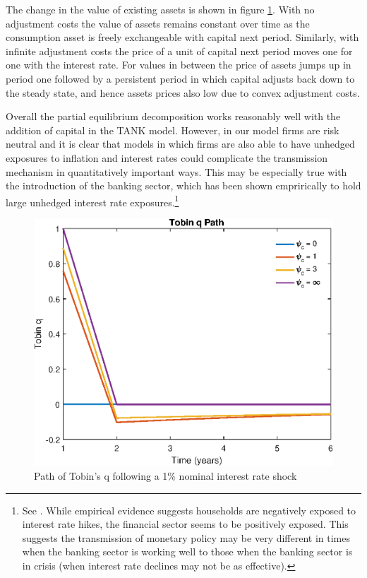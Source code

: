 \documentclass[titlepage]{\econtex}\newcommand{\texname}{ConsumptionHeterogeneity}
\begin{document}


The change in the value of existing assets is shown in figure \ref{fig:PathTobinq}. With no adjustment costs the value of assets remains constant over time as the consumption asset is freely exchangeable with capital next period. Similarly, with infinite adjustment costs the price of a unit of capital next period moves one for one with the interest rate. For values in between the price of assets jumps up in period one followed by a persistent period in which capital adjusts back down to the steady state, and hence assets prices also low due to convex adjustment costs.

Overall the partial equilibrium decomposition works reasonably well with the addition of capital in the TANK model. However, in our model firms are risk neutral and it is clear that models in which firms are also able to have unhedged exposures to inflation and interest rates could complicate the transmission mechanism in quantitatively important ways. This may be especially true with the introduction of the banking sector, which has been shown emprirically to hold large unhedged interest rate exposures.\footnote{See \cite{landier_banks_2013}. While empirical evidence suggests households are negatively exposed to interest rate hikes, the financial sector seems to be positively exposed. This suggests the transmission of monetary policy may be very different in times when the banking sector is working well to those when the banking sector is in crisis (when interest rate declines may not be as effective).}

\begin{figure} 
	\begin{centering}
		\includegraphics[scale=0.7]{../Matlab/DynareCode/Figures/TANK_capital_IRF_q.eps}
		\caption{Path of Tobin's q following a 1\% nominal interest rate shock}
		\label{fig:PathTobinq}
	\end{centering}
\end{figure}
\end{document}
